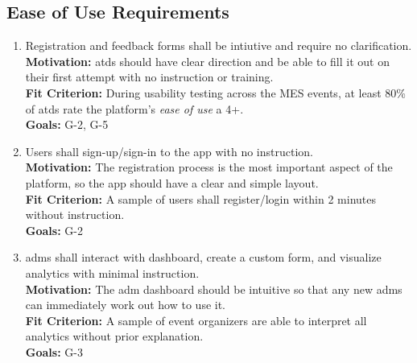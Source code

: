 \documentclass[12pt]{article}
\begin{document}
\subsection{Ease of Use Requirements}
\begin{enumerate}[label=\bfseries ER-\arabic*:, wide=0pt, leftmargin=*, 
  ref=\bfseries ER-\arabic*]
  \item \label{ER1} Registration and feedback forms shall be intiutive and require no clarification.\\[2mm]
    {\bf Motivation:} \Glspl{atd} should have clear direction and be able to fill it out on their first attempt with no instruction or training.\\
    {\bf Fit Criterion:} During usability testing across the MES events, at least 80\% of \glspl{atd} rate the platform's \textit{ease of use} a 4+.\\
    {\bf Goals:} G-2, G-5
  \item \label{ER2} Users shall sign-up/sign-in to the app with no instruction. \\[2mm]
    {\bf Motivation:} The registration process is the most important aspect of the platform, so the app should have a clear and simple layout.\\
    {\bf Fit Criterion:} A sample of users shall register/login within 2 minutes without instruction.\\
    {\bf Goals:} G-2
  \item \label{ER3} \Glspl{adm} shall interact with dashboard, create a custom form, and visualize analytics with minimal instruction.\\[2mm]
    {\bf Motivation:} The \gls{adm} dashboard should be intuitive so that any new \glspl{adm} can immediately work out how to use it.\\
    {\bf Fit Criterion:} A sample of event organizers are able to interpret all analytics without prior explanation.\\
    {\bf Goals:} G-3
\end{enumerate}
\end{document}
